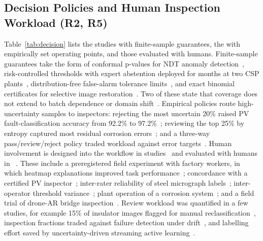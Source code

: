 \documentclass[journal]{IEEEtran}
\begin{document}
\subsection{Decision Policies and Human Inspection Workload (R2, R5)}
Table~\ref{tab:decision} lists the \nGuarFS{} studies with finite-sample guarantees, the \nGuarEOP{} with empirically set operating points, and those evaluated with humans. Finite-sample guarantees take the form of conformal p-values for NDT anomaly detection~\cite{estermann2026unsupervised}, risk-controlled thresholds with expert abstention deployed for months at two CSP plants~\cite{estievenart2025risk}, distribution-free false-alarm tolerance limits~\cite{deng2026distribution}, and exact binomial certificates for selective image restoration~\cite{yang2026saferestore}. Two of these state that coverage does not extend to batch dependence or domain shift~\cite{deng2026distribution,yang2026saferestore}. Empirical policies route high-uncertainty samples to inspectors: rejecting the most uncertain 20\% raised PV fault-classification accuracy from 92.2\% to 97.2\%~\cite{alqahtani2026robust}; reviewing the top 25\% by entropy captured most residual corrosion errors~\cite{gohel2026interpretable}; and a three-way pass/review/reject policy traded workload against error targets~\cite{kinalioglu2026risk}. Human involvement is designed into the workflow in \nHumDes{} studies~\citeHumDes{} and evaluated with humans in \nHumEval~\citeHumEval. These include a preregistered field experiment with factory workers, in which heatmap explanations improved task performance~\cite{senoner2024explainable}; concordance with a certified PV inspector~\cite{mistry2026from}; inter-rater reliability of steel micrograph labels~\cite{durmaz2023microstructure}; inter-operator threshold variance~\cite{mikayilov2025development}; plant operation of a corrosion system~\cite{shimbo2023pipe,shimbo2023operation}; and a field trial of drone-AR bridge inspection~\cite{lapointe2022for}. Review workload was quantified in a few studies, for example 15\% of insulator images flagged for manual reclassification~\cite{floreale2025automated}, inspection fractions traded against failure detection under drift~\cite{bauer2025handling}, and labelling effort saved by uncertainty-driven streaming active learning~\cite{rozanec2022streaming}.


\end{document}
